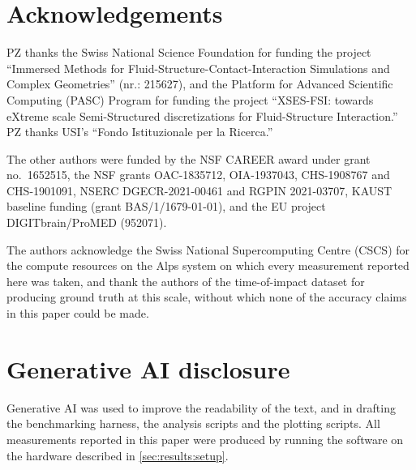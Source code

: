 \section*{Acknowledgements}
\label{sec:thanks}

PZ thanks the Swiss National Science Foundation for funding the project
``Immersed Methods for Fluid-Structure-Contact-Interaction Simulations and
Complex Geometries'' (nr.: 215627), and the Platform for Advanced Scientific
Computing (PASC) Program for funding the project ``XSES-FSI: towards eXtreme
scale Semi-Structured discretizations for Fluid-Structure Interaction.'' PZ
thanks USI's ``Fondo Istituzionale per la Ricerca.''

The other authors were funded by the NSF CAREER award under grant no.\ 1652515,
the NSF grants OAC-1835712, OIA-1937043, CHS-1908767 and CHS-1901091, NSERC
DGECR-2021-00461 and RGPIN 2021-03707, KAUST baseline funding (grant
BAS/1/1679-01-01), and the EU project DIGITbrain/ProMED (952071).

The authors acknowledge the Swiss National Supercomputing Centre (CSCS) for the
compute resources on the Alps system on which every measurement reported here
was taken, and thank the authors of the time-of-impact dataset for producing
ground truth at this scale, without which none of the accuracy claims in this
paper could be made.

\section*{Generative AI disclosure}

Generative AI was used to improve the readability of the text, and in drafting
the benchmarking harness, the analysis scripts and the plotting scripts. All
measurements reported in this paper were produced by running the software on the
hardware described in \cref{sec:results:setup}.
